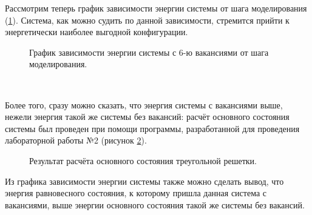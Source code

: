 \documentclass[14pt,a4paper,report]{ncc}
\begin{document}
Рассмотрим теперь график зависимости энергии системы от шага моделирования (\ref{ris:image3}). Система, как можно судить по данной зависимости, стремится прийти к энергетически наиболее выгодной конфигурации. 
\begin{figure}[h! ]
\caption{График зависимости энергии системы с 6-ю вакансиями от шага моделирования.}
\label{ris:image3}
\end{figure}
\

Более того, сразу можно сказать, что энергия системы с вакансиями выше, нежели энергия такой же системы без вакансий: расчёт основного состояния системы был проведен при помощи программы, разработанной для проведения лабораторной работы №2 (рисунок \ref{ris:image4}).
\

\begin{figure}[h!]
\caption{Результат расчёта основного состояния треугольной решетки.}
\label{ris:image4}
\end{figure}
Из графика зависимости энергии системы также можно сделать вывод, что энергия равновесного состояния, к которому пришла данная система с вакансиями, выше энергии основного состояния такой же системы без вакансий.
\
\end{document}
